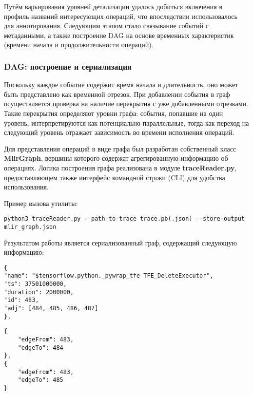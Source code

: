 Путём варьирования уровней детализации удалось добиться включения в профиль названий интересующих операций, что впоследствии использовалось для аннотирования.
Следующим этапом стало связывание событий с метаданными, а также построение DAG на основе временных характеристик (времени начала и продолжительности операций).

\subsubsection{DAG: построение и сериализация}

Поскольку каждое событие содержит время начала и длительность, оно может быть представлено как временной отрезок.
При добавлении события в граф осуществляется проверка на наличие перекрытия с уже добавленными отрезками.
Такие перекрытия определяют уровни графа: события, попавшие на один уровень, интерпретируются как потенциально параллельные, тогда как переход на следующий уровень отражает зависимость во времени исполнения операций.

Для представления операций в виде графа был разработан собственный класс \textbf{MlirGraph}, вершины которого содержат агрегированную информацию об операциях.
Логика построения графа реализована в модуле \textbf{traceReader.py}, предоставляющем также интерфейс командной строки (CLI) для удобства использования.

Пример вызова утилиты:

\begin{lstlisting}[caption={Пример использования программы traceReader.py}]
python3 traceReader.py --path-to-trace trace.pb(.json) --store-output mlir_graph.json
\end{lstlisting}

Результатом работы является сериализованный граф, содержащий следующую информацию:

\noindent
\begin{minipage}{0.48\textwidth}
\begin{lstlisting}[caption={Формат вершины MLIR-графа}]
{
"name": "$tensorflow.python._pywrap_tfe TFE_DeleteExecutor",
"ts": 37501000000,
"duration": 2000000,
"id": 483,
"adj": [484, 485, 486, 487]
},
\end{lstlisting}
\end{minipage}\hfill
\begin{minipage}{0.48\textwidth}
\begin{lstlisting}[caption={Формат ребра MLIR-графа}]
{
    "edgeFrom": 483,
    "edgeTo": 484
},
{
    "edgeFrom": 483,
    "edgeTo": 485
}
\end{lstlisting}
\end{minipage}

